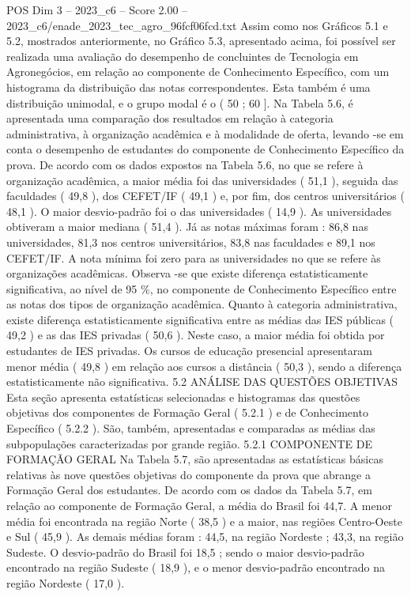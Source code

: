 \begin{textsample}{POS Dim 3 – 2023\_c6 – Score 2.00 – 2023\_c6/enade\_2023\_tec\_agro\_96fcf06fcd.txt}
Assim como nos Gráficos 5.1 e 5.2, mostrados anteriormente, no Gráfico 5.3, apresentado acima, foi possível ser realizada uma avaliação do desempenho de concluintes de Tecnologia em Agronegócios, em relação ao componente de Conhecimento Específico, com um histograma da distribuição das notas correspondentes.
Esta também é uma distribuição unimodal, e o grupo modal é o ( 50 ; 60 ].
Na Tabela 5.6, é apresentada uma comparação dos resultados em relação à categoria administrativa, à organização acadêmica e à modalidade de oferta, levando -se em conta o desempenho de estudantes do componente de Conhecimento Específico da prova.
De acordo com os dados expostos na Tabela 5.6, no que se refere à organização acadêmica, a maior média foi das universidades ( 51,1 ), seguida das faculdades ( 49,8 ), dos CEFET/IF ( 49,1 ) e, por fim, dos centros universitários ( 48,1 ).
O maior desvio-padrão foi o das universidades ( 14,9 ).
As universidades obtiveram a maior mediana ( 51,4 ).
Já as notas máximas foram : 86,8 nas universidades, 81,3 nos centros universitários, 83,8 nas faculdades e 89,1 nos CEFET/IF.
A nota mínima foi zero para as universidades no que se refere às organizações acadêmicas.
Observa -se que existe diferença estatisticamente significativa, ao nível de 95 \%, no componente de Conhecimento Específico entre as notas dos tipos de organização acadêmica.
Quanto à categoria administrativa, existe diferença estatisticamente significativa entre as médias das IES públicas ( 49,2 ) e as das IES privadas ( 50,6 ).
Neste caso, a maior média foi obtida por estudantes de IES privadas.
Os cursos de educação presencial apresentaram menor média ( 49,8 ) em relação aos cursos a distância ( 50,3 ), sendo a diferença estatisticamente não significativa. 5.2 ANÁLISE DAS QUESTÕES OBJETIVAS Esta seção apresenta estatísticas selecionadas e histogramas das questões objetivas dos componentes de Formação Geral ( 5.2.1 ) e de Conhecimento Específico ( 5.2.2 ).
São, também, apresentadas e comparadas as médias das subpopulações caracterizadas por grande região. 5.2.1 COMPONENTE DE FORMAÇÃO GERAL Na Tabela 5.7, são apresentadas as estatísticas básicas relativas às nove questões objetivas do componente da prova que abrange a Formação Geral dos estudantes.
De acordo com os dados da Tabela 5.7, em relação ao componente de Formação Geral, a média do Brasil foi 44,7.
A menor média foi encontrada na região Norte ( 38,5 ) e a maior, nas regiões Centro-Oeste e Sul ( 45,9 ).
As demais médias foram : 44,5, na região Nordeste ; 43,3, na região Sudeste.
O desvio-padrão do Brasil foi 18,5 ; sendo o maior desvio-padrão encontrado na região Sudeste ( 18,9 ), e o menor desvio-padrão encontrado na região Nordeste ( 17,0 ).

\end{textsample}
